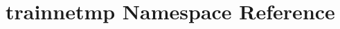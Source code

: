 \hypertarget{namespacetrainnetmp}{\section{trainnetmp Namespace Reference}
\label{namespacetrainnetmp}
}

